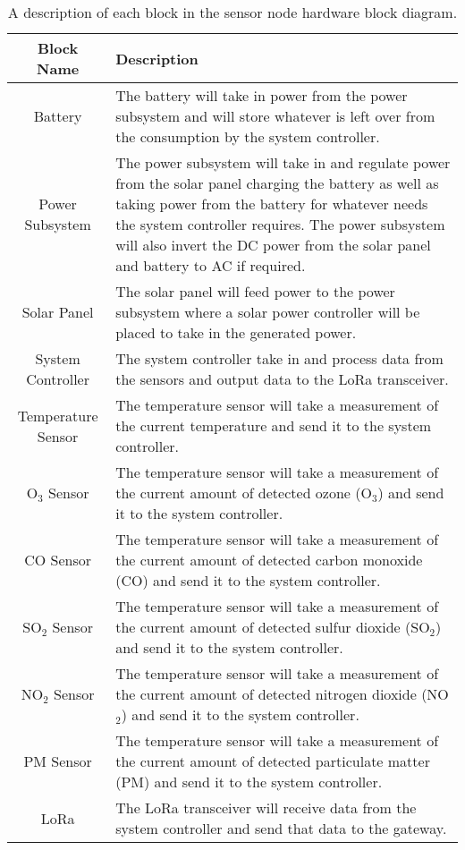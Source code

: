 \begin{table}[H]
    \centering
    \caption{A description of each block in the sensor node hardware block diagram.}
    \begin{tabularx}{\linewidth}{|c|X|}
        \hline
        Block Name & Description \\ 
        \hline
        Battery & The battery will take in power from the power subsystem and will store whatever is left over from the consumption by the system controller. \\\hline
        Power Subsystem & The power subsystem will take in and regulate power from the solar panel charging the battery as well as taking power from the battery for whatever needs the system controller requires. The power subsystem will also invert the DC power from the solar panel and battery to AC if required. \\\hline
        Solar Panel & The solar panel will feed power to the power subsystem where a solar power controller will be placed to take in the generated power. \\\hline
        System Controller & The system controller take in and process data from the sensors and output data to the LoRa transceiver. \\\hline
        Temperature Sensor & The temperature sensor will take a measurement of the current temperature and send it to the system controller. \\\hline
        O$_3$ Sensor & The temperature sensor will take a measurement of the current amount of detected ozone (O$_3$) and send it to the system controller. \\\hline
        CO Sensor & The temperature sensor will take a measurement of the current amount of detected carbon monoxide (CO) and send it to the system controller. \\\hline
        SO$_2$ Sensor & The temperature sensor will take a measurement of the current amount of detected sulfur dioxide (SO$_2$) and send it to the system controller. \\\hline
        NO$_2$ Sensor & The temperature sensor will take a measurement of the current amount of detected nitrogen dioxide (NO$_2$) and send it to the system controller. \\\hline
        PM Sensor & The temperature sensor will take a measurement of the current amount of detected particulate matter (PM) and send it to the system controller. \\\hline
        LoRa & The LoRa transceiver will receive data from the system controller and send that data to the gateway. \\\hline
    \end{tabularx}
    
    \label{tab:Node_Hardware_BD_Description}
\end{table}